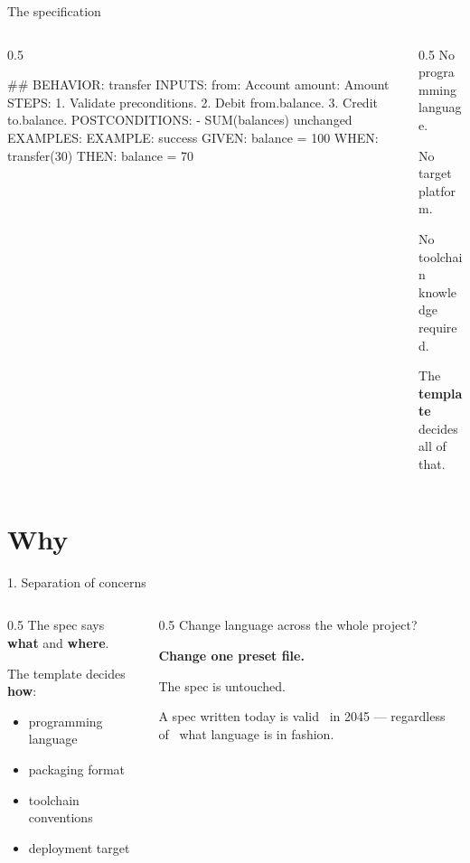 \documentclass[
  10pt,
  ignorenonframetext,
  aspectratio=169,
  10pt]{beamer}
\newenvironment{Shaded}{}{}
\newcommand{\FunctionTok}[1]{\textcolor[rgb]{0.02,0.16,0.49}{#1}}
\newcommand{\NormalTok}[1]{#1}
\newcommand{\SpecialStringTok}[1]{\textcolor[rgb]{0.73,0.40,0.53}{#1}}
\providecommand{\tightlist}{%
  \setlength{\itemsep}{0pt}\setlength{\parskip}{0pt}}
\begin{document}
\begin{frame}[fragile]{The specification}
\protect\hypertarget{the-specification}{}
\begin{columns}[T]
\begin{column}{0.5\textwidth}
\begin{Shaded}
\begin{Highlighting}[]
\FunctionTok{\#\# BEHAVIOR: transfer}
\NormalTok{INPUTS:}
\NormalTok{  from: Account}
\NormalTok{  amount: Amount}
\NormalTok{STEPS:}
\SpecialStringTok{  1. }\NormalTok{Validate preconditions.}
\SpecialStringTok{  2. }\NormalTok{Debit from.balance.}
\SpecialStringTok{  3. }\NormalTok{Credit to.balance.}
\NormalTok{POSTCONDITIONS:}
\SpecialStringTok{  {-} }\NormalTok{SUM(balances) unchanged}
\NormalTok{EXAMPLES:}
\NormalTok{  EXAMPLE: success}
\NormalTok{  GIVEN: balance = 100}
\NormalTok{  WHEN:  transfer(30)}
\NormalTok{  THEN:  balance = 70}
\end{Highlighting}
\end{Shaded}
\end{column}

\begin{column}{0.5\textwidth}
No programming language.

No target platform.

No toolchain knowledge required.

The \textbf{template} decides all of that.
\end{column}
\end{columns}
\end{frame}

\hypertarget{why}{%
\section{Why}\label{why}}

\begin{frame}{1. Separation of concerns}
\protect\hypertarget{separation-of-concerns}{}
\begin{columns}[T]
\begin{column}{0.5\textwidth}
The spec says \textbf{what} and \textbf{where}.

The template decides \textbf{how}:

\begin{itemize}
\tightlist
\item
  programming language
\item
  packaging format
\item
  toolchain conventions
\item
  deployment target
\end{itemize}
\end{column}

\begin{column}{0.5\textwidth}
Change language across the whole project?

\textbf{Change one preset file.}

The spec is untouched.

A spec written today is valid~ in 2045 --- regardless of~ what language
is in fashion.
\end{column}
\end{columns}
\end{frame}
\end{document}
